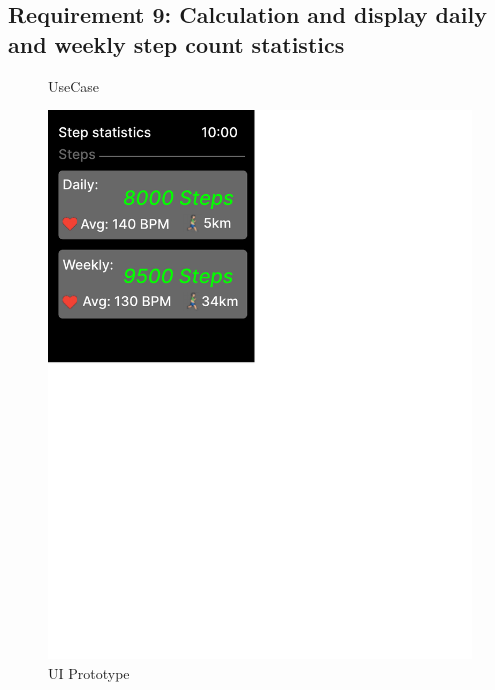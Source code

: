 \documentclass{article}
\begin{document}
	\subsection{Requirement 9: Calculation and display daily and weekly step count statistics}
		\begin{figure}[h!]
			\centering
			\captionsetup{labelformat=empty}
			\caption{UseCase}
		\end{figure}
		\clearpage
		\begin{figure}[h!]
			\centering
			\captionsetup{labelformat=empty}
			\caption{UI Prototype}
		    	\includegraphics[scale=1.6, angle=0]{Marc/UIPrototype/steps.pdf}
		\end{figure}
		\clearpage
\end{document}
